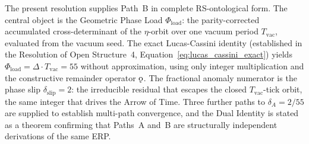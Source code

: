 \documentclass[11pt, letterpaper]{article}
\newcommand{\koppa}{\mathbin{\text{\rm\k{o}}}}
\theoremstyle{definition}
\theoremstyle{plain}
\begin{document}
The present resolution supplies Path~B in complete RS-ontological form. The
central object is the Geometric Phase Load $\Phi_\mathrm{load}$:
the parity-corrected accumulated cross-determinant of the $\eta$-orbit over
one vacuum period $T_\mathrm{vac}$, evaluated from the vacuum seed. The exact
Lucas-Cassini identity (established in the Resolution of Open Structure~4,
Equation~\eqref{eq:lucas_cassini_exact}) yields $\Phi_\mathrm{load} = \Delta \cdot
T_\mathrm{vac} = 55$ without approximation, using only integer multiplication and
the constructive remainder operator $\koppa$. The fractional anomaly numerator is
the phase slip $\delta_\mathrm{slip} = 2$: the irreducible residual that escapes
the closed $T_\mathrm{vac}$-tick orbit, the same integer that drives the Arrow of
Time. Three further paths to $\delta_A = 2/55$ are supplied to establish multi-path
convergence, and the Dual Identity is stated as a theorem confirming that Paths~A
and~B are structurally independent derivations of the same ERP.
\end{document}
